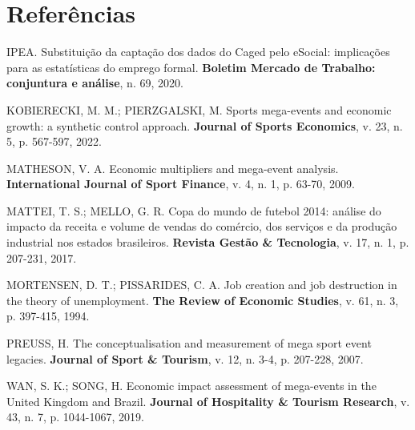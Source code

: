\documentclass[12pt,a4paper]{article}
\newenvironment{referencias}{%
  \section*{Referências}
  \begin{singlespace}
  \setlength{\parindent}{0pt}
  \setlength{\parskip}{6pt}
  \raggedright
}{%
  \end{singlespace}
}
\begin{document}
\begin{referencias}
IPEA. Substituição da captação dos dados do Caged pelo eSocial: implicações
para as estatísticas do emprego formal. \textbf{Boletim Mercado de Trabalho:
conjuntura e análise}, n. 69, 2020.

KOBIERECKI, M. M.; PIERZGALSKI, M. Sports mega-events and economic growth: a
synthetic control approach. \textbf{Journal of Sports Economics}, v. 23,
n. 5, p. 567-597, 2022.

MATHESON, V. A. Economic multipliers and mega-event analysis.
\textbf{International Journal of Sport Finance}, v. 4, n. 1, p. 63-70, 2009.

MATTEI, T. S.; MELLO, G. R. Copa do mundo de futebol 2014: análise do
impacto da receita e volume de vendas do comércio, dos serviços e da produção
industrial nos estados brasileiros. \textbf{Revista Gestão \& Tecnologia},
v. 17, n. 1, p. 207-231, 2017.

MORTENSEN, D. T.; PISSARIDES, C. A. Job creation and job destruction in the
theory of unemployment. \textbf{The Review of Economic Studies}, v. 61, n. 3,
p. 397-415, 1994.

PREUSS, H. The conceptualisation and measurement of mega sport event
legacies. \textbf{Journal of Sport \& Tourism}, v. 12, n. 3-4, p. 207-228,
2007.

WAN, S. K.; SONG, H. Economic impact assessment of mega-events in the United
Kingdom and Brazil. \textbf{Journal of Hospitality \& Tourism Research},
v. 43, n. 7, p. 1044-1067, 2019.

\end{referencias}
\end{document}
